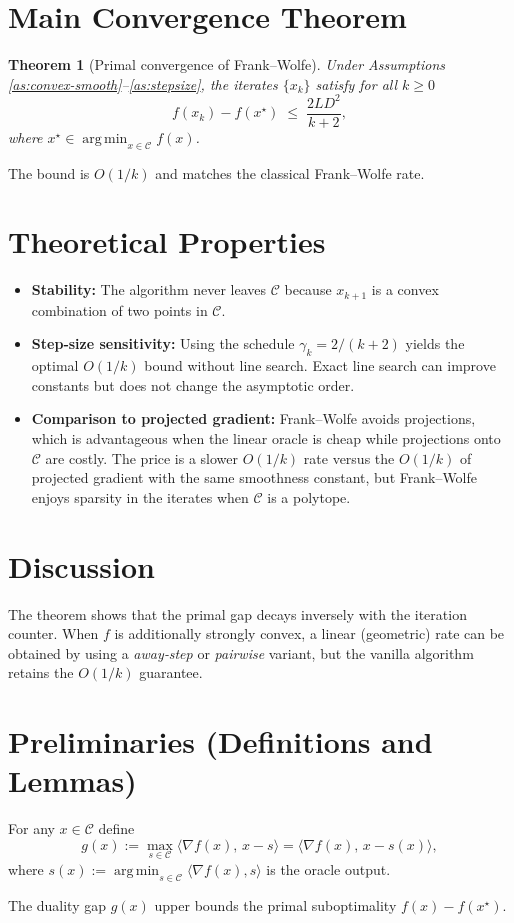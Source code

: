 \documentclass{article}
\newtheorem{theorem}{Theorem}
\newcommand{\argmin}{\operatorname*{arg\,min}}
\begin{document}
\section*{Main Convergence Theorem}
\begin{theorem}[Primal convergence of Frank–Wolfe]\label{thm:fw-rate}
Under Assumptions \ref{as:convex-smooth}–\ref{as:stepsize}, the iterates $\{x_k\}$ satisfy for all $k\ge 0$
\[
f(x_k)-f(x^\star)\;\le\; \frac{2L D^2}{k+2},
\]
where $x^\star\in\argmin_{x\in\mathcal C}f(x)$.
\end{theorem}
The bound is $O(1/k)$ and matches the classical Frank–Wolfe rate.

\section*{Theoretical Properties}
\begin{itemize}
\item \textbf{Stability:} The algorithm never leaves $\mathcal C$ because $x_{k+1}$ is a convex combination of two points in $\mathcal C$.
\item \textbf{Step‑size sensitivity:} Using the schedule $\gamma_k=2/(k+2)$ yields the optimal $O(1/k)$ bound without line search. Exact line search can improve constants but does not change the asymptotic order.
\item \textbf{Comparison to projected gradient:} Frank–Wolfe avoids projections, which is advantageous when the linear oracle is cheap while projections onto $\mathcal C$ are costly. The price is a slower $O(1/k)$ rate versus the $O(1/k)$ of projected gradient with the same smoothness constant, but Frank–Wolfe enjoys sparsity in the iterates when $\mathcal C$ is a polytope.
\end{itemize}

\section*{Discussion}
The theorem shows that the primal gap decays inversely with the iteration counter. When $f$ is additionally strongly convex, a linear (geometric) rate can be obtained by using a \emph{away‑step} or \emph{pairwise} variant, but the vanilla algorithm retains the $O(1/k)$ guarantee.

\section*{Preliminaries (Definitions and Lemmas)}
\begin{definition}\label{def:gap}
For any $x\in\mathcal C$ define
\[
g(x) := \max_{s\in\mathcal C}\langle \nabla f(x),\,x-s\rangle
      = \langle \nabla f(x),\,x-s(x)\rangle ,
\]
where $s(x):=\argmin_{s\in\mathcal C}\langle \nabla f(x),s\rangle$ is the oracle output.
\end{definition}
The duality gap $g(x)$ upper bounds the primal suboptimality $f(x)-f(x^\star)$.
\end{document}
